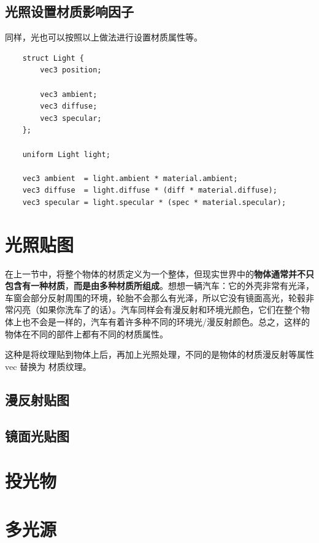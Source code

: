 \documentclass[UTF8,a4paper,12pt]{ctexbook}
\begin{document}
			
			
		\subsection{光照设置材质影响因子}
			同样，光也可以按照以上做法进行设置材质属性等。
		
			\begin{lstlisting}
	struct Light {
	    vec3 position;
	
	    vec3 ambient;
	    vec3 diffuse;
	    vec3 specular;
	};
	
	uniform Light light;		
			
	vec3 ambient  = light.ambient * material.ambient;
	vec3 diffuse  = light.diffuse * (diff * material.diffuse);
	vec3 specular = light.specular * (spec * material.specular);			
			\end{lstlisting}
		
	
	\section{光照贴图}	
		在上一节中，将整个物体的材质定义为一个整体，但现实世界中的\textbf{物体通常并不只包含有一种材质}，\textbf{而是由多种材质所组成}。想想一辆汽车：它的外壳非常有光泽，车窗会部分反射周围的环境，轮胎不会那么有光泽，所以它没有镜面高光，轮毂非常闪亮（如果你洗车了的话）。汽车同样会有漫反射和环境光颜色，它们在整个物体上也不会是一样的，汽车有着许多种不同的环境光/漫反射颜色。总之，这样的物体在不同的部件上都有不同的材质属性。
		
		
		这种是将纹理贴到物体上后，再加上光照处理，不同的是物体的材质漫反射等属性vec 替换为 材质纹理。
		
		\subsection{漫反射贴图}
				
		\subsection{镜面光贴图}
			
			
	\section{投光物}
		
	
	
	
	\section{多光源}
	
\end{document}
